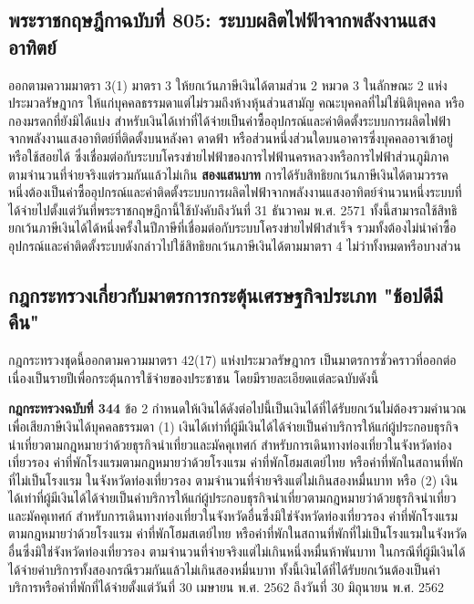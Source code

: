 \documentclass[12pt,a4paper]{article}
\newcommand{\hilight}[1]{\textbf{#1}}
\begin{document}
\subsection*{พระราชกฤษฎีกาฉบับที่ 805: ระบบผลิตไฟฟ้าจากพลังงานแสงอาทิตย์}

ออกตามความมาตรา 3(1) มาตรา 3 ให้ยกเว้นภาษีเงินได้ตามส่วน 2 หมวด 3 ในลักษณะ 2 แห่งประมวลรัษฎากร ให้แก่บุคคลธรรมดาแต่ไม่รวมถึงห้างหุ้นส่วนสามัญ คณะบุคคลที่ไม่ใช่นิติบุคคล หรือกองมรดกที่ยังมิได้แบ่ง สำหรับเงินได้เท่าที่ได้จ่ายเป็นค่าซื้ออุปกรณ์และค่าติดตั้งระบบการผลิตไฟฟ้าจากพลังงานแสงอาทิตย์ที่ติดตั้งบนหลังคา ดาดฟ้า หรือส่วนหนึ่งส่วนใดบนอาคารซึ่งบุคคลอาจเข้าอยู่หรือใช้สอยได้ ซึ่งเชื่อมต่อกับระบบโครงข่ายไฟฟ้าของการไฟฟ้านครหลวงหรือการไฟฟ้าส่วนภูมิภาค ตามจำนวนที่จ่ายจริงแต่รวมกันแล้วไม่เกิน \hilight{สองแสนบาท} การได้รับสิทธิยกเว้นภาษีเงินได้ตามวรรคหนึ่งต้องเป็นค่าซื้ออุปกรณ์และค่าติดตั้งระบบการผลิตไฟฟ้าจากพลังงานแสงอาทิตย์จำนวนหนึ่งระบบที่ได้จ่ายไปตั้งแต่วันที่พระราชกฤษฎีกานี้ใช้บังคับถึงวันที่ 31 ธันวาคม พ.ศ. 2571 ทั้งนี้สามารถใช้สิทธิยกเว้นภาษีเงินได้ได้หนึ่งครั้งในปีภาษีที่เชื่อมต่อกับระบบโครงข่ายไฟฟ้าสำเร็จ รวมทั้งต้องไม่นำค่าซื้ออุปกรณ์และค่าติดตั้งระบบดังกล่าวไปใช้สิทธิยกเว้นภาษีเงินได้ตามมาตรา 4 ไม่ว่าทั้งหมดหรือบางส่วน

\subsection*{กฎกระทรวงเกี่ยวกับมาตรการกระตุ้นเศรษฐกิจประเภท "ช้อปดีมีคืน"}

กฎกระทรวงชุดนี้ออกตามความมาตรา 42(17) แห่งประมวลรัษฎากร เป็นมาตรการชั่วคราวที่ออกต่อเนื่องเป็นรายปีเพื่อกระตุ้นการใช้จ่ายของประชาชน โดยมีรายละเอียดแต่ละฉบับดังนี้

\textbf{กฎกระทรวงฉบับที่ 344} ข้อ 2 กำหนดให้เงินได้ดังต่อไปนี้เป็นเงินได้ที่ได้รับยกเว้นไม่ต้องรวมคำนวณเพื่อเสียภาษีเงินได้บุคคลธรรมดา (1) เงินได้เท่าที่ผู้มีเงินได้ได้จ่ายเป็นค่าบริการให้แก่ผู้ประกอบธุรกิจนำเที่ยวตามกฎหมายว่าด้วยธุรกิจนำเที่ยวและมัคคุเทศก์ สำหรับการเดินทางท่องเที่ยวในจังหวัดท่องเที่ยวรอง ค่าที่พักโรงแรมตามกฎหมายว่าด้วยโรงแรม ค่าที่พักโฮมสเตย์ไทย หรือค่าที่พักในสถานที่พักที่ไม่เป็นโรงแรม ในจังหวัดท่องเที่ยวรอง ตามจำนวนที่จ่ายจริงแต่ไม่เกินสองหมื่นบาท หรือ (2) เงินได้เท่าที่ผู้มีเงินได้ได้จ่ายเป็นค่าบริการให้แก่ผู้ประกอบธุรกิจนำเที่ยวตามกฎหมายว่าด้วยธุรกิจนำเที่ยวและมัคคุเทศก์ สำหรับการเดินทางท่องเที่ยวในจังหวัดอื่นซึ่งมิใช่จังหวัดท่องเที่ยวรอง ค่าที่พักโรงแรมตามกฎหมายว่าด้วยโรงแรม ค่าที่พักโฮมสเตย์ไทย หรือค่าที่พักในสถานที่พักที่ไม่เป็นโรงแรมในจังหวัดอื่นซึ่งมิใช่จังหวัดท่องเที่ยวรอง ตามจำนวนที่จ่ายจริงแต่ไม่เกินหนึ่งหมื่นห้าพันบาท ในกรณีที่ผู้มีเงินได้ได้จ่ายค่าบริการทั้งสองกรณีรวมกันแล้วไม่เกินสองหมื่นบาท ทั้งนี้เงินได้ที่ได้รับยกเว้นต้องเป็นค่าบริการหรือค่าที่พักที่ได้จ่ายตั้งแต่วันที่ 30 เมษายน พ.ศ. 2562 ถึงวันที่ 30 มิถุนายน พ.ศ. 2562
\end{document}
